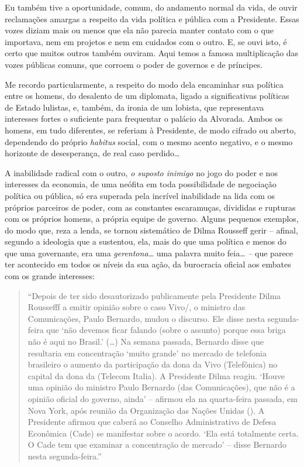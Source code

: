 Eu também tive a oportunidade, comum, do andamento normal da vida, de
ouvir reclamações amargas a respeito da vida política e pública com a
Presidente. Essas vozes diziam mais ou menos que ela não parecia manter
contato com o que importava, nem em projetos e nem em cuidados com o
outro. E, se ouvi isto, é certo que muitos outros também ouviram. Aqui
temos a famosa multiplicação das vozes públicas comuns, que corroem o
poder de governos e de príncipes.

Me recordo particularmente, a respeito do modo dela encaminhar sua
política entre os homens, do desalento de um diplomata, ligado a
significativas políticas de Estado lulistas, e, também, da ironia de um
lobista, que representava interesses fortes o suficiente para frequentar
o palácio da Alvorada. Ambos os homens, em tudo diferentes, se referiam
à Presidente, de modo cifrado ou aberto, dependendo do próprio
\emph{habitus} social, com o mesmo acento negativo, e o mesmo horizonte
de desesperança, de real caso perdido…

A inabilidade radical com o outro, \emph{o suposto inimigo} no jogo do
poder e nos interesses da economia, de uma neófita em toda possibilidade
de negociação política ou pública, só era superada pela incrível
inabilidade na lida com os próprios parceiros de poder, com as
constantes escaramuças, divididas e rupturas com os próprios homens, a
própria equipe de governo. Alguns pequenos exemplos, do modo que, reza a
lenda, se tornou sistemático de Dilma Rousseff gerir -- afinal, segundo
a ideologia que a sustentou, ela, mais do que uma política e menos do
que uma governante, era uma \emph{gerentona…} uma palavra muito
feia… \emph{--} que parece ter acontecido em todos os níveis da sua
ação, da burocracia oficial aos embates com os grande interesses:



\begin{quote}
``Depois de ter
sido {desautorizado
publicamente pela Presidente Dilma Roussefff a emitir opinião sobre o
caso Vivo/}, o ministro das Comunicações, Paulo Bernardo, mudou o
discurso. Ele disse nesta segunda-feira que `não devemos ficar falando
(sobre o assunto) porque essa briga não é aqui no Brasil.' (…) Na
semana passada, Bernardo disse que resultaria em concentração `muito
grande' no mercado de telefonia brasileiro o aumento da participação da
dona da Vivo (Telefônica) no capital da dona da  (Telecom Italia). A
Presidente Dilma reagiu. `Houve uma opinião do ministro Paulo Bernardo
(das Comunicações), que não é a opinião oficial do governo, ainda' --
afirmou ela na quarta-feira passada, em Nova York, após reunião da
Organização das Nações Unidas (). A Presidente afirmou que caberá ao
Conselho Administrativo de Defesa Econômica (Cade) se manifestar sobre o
acordo. `Ela está totalmente certa. O Cade tem que examinar a
concentração de mercado' -- disse Bernardo nesta segunda-feira.''
\end{quote}

